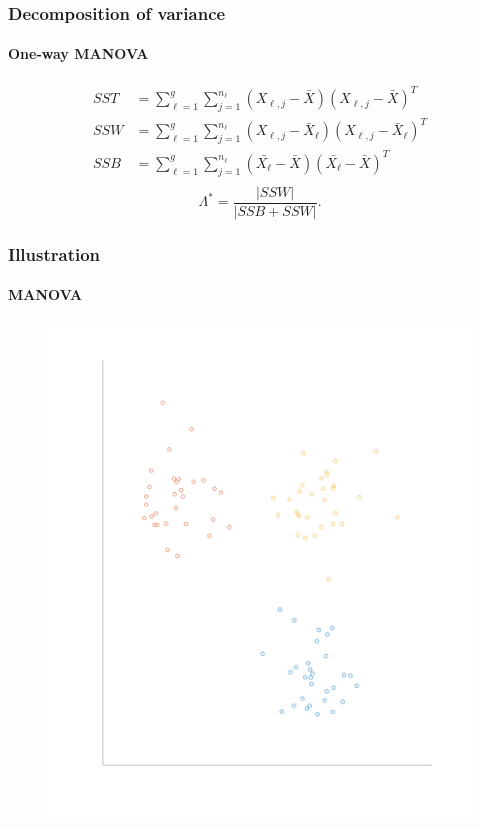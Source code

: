 \documentclass[aspectratio=169,10pt,t]{beamer}
\begin{document}
\begin{frame}[t]
	\frametitle{Decomposition of variance}
	\framesubtitle{One-way MANOVA}
	\[
	\begin{aligned}
        SST &=
		\sum^{g}_{\ell=1} 
		\sum^{n_{\ell}}_{j=1} 
		\left( X_{\ell,j}- \bar{X} \right) 
		\left( X_{\ell,j}- \bar{X} \right) ^{T}\\
		SSW &=
		\sum^{g}_{\ell=1} 
		\sum^{n_{\ell}}_{j=1} 
		\left( X_{\ell,j}- \bar{X}_{\ell} \right) 
		\left( X_{\ell,j}- \bar{X}_{\ell} \right) ^{T}\\
		SSB &=
		\sum^{g}_{\ell=1} 
		\sum^{n_\ell}_{j=1} 
		\left( \bar{X_{\ell}}- \bar{X} \right) 
		\left( \bar{X_{\ell}}- \bar{X} \right) ^{T}\\
	\end{aligned}
	\] 
	\vspace{1cm}
    \pause
	\[
	\Lambda ^{*} = \frac{|SSW|}{|SSB + SSW |} 
	.\] 

\end{frame}
\begin{frame}[t]
    \frametitle{Illustration}
    \framesubtitle{MANOVA}
    \begin{figure}[H]
    \includegraphics[scale=0.28]{clusters.png}
    \end{figure} 
\end{frame}
\end{document}
